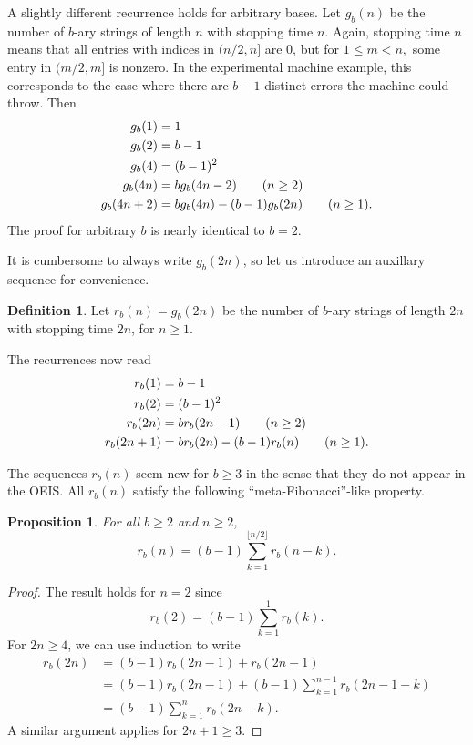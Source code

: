 \documentclass[12pt]{article}
\newtheorem{proposition}{Proposition}
\theoremstyle{definition}
\newtheorem{definition}{Definition}
\begin{document}
A slightly different recurrence holds for arbitrary bases. Let $g_b(n)$ be the
number of $b$-ary strings of length $n$ with stopping time $n$. Again, stopping
time $n$ means that all entries with indices in $(n/2, n]$ are 0, but for
$1\leq m<n,$ some entry in $(m/2, m]$ is nonzero. In the experimental machine
example, this corresponds to the case where there are $b-1$ distinct errors the
machine could throw. Then
\begin{align}
    g_b(1) &= 1 \notag \\
    g_b(2) &= b - 1 \notag \\
    g_b(4) &= (b - 1)^2 \notag \\
    g_b(4n) &= b g_b(4n - 2) \tag{$n \geq 2$}\\
    g_b(4n + 2) &= b g_b(4n) - (b - 1) g_b(2n) \tag{$n \geq 1$}.
\end{align}
The proof for arbitrary $b$ is nearly identical to $b = 2$.

It is cumbersome to always write $g_b(2n)$, so let us introduce an auxillary
sequence for convenience.

\begin{definition}
    Let $r_b(n) = g_b(2n)$ be the number of $b$-ary strings of length $2n$ with
    stopping time $2n$, for $n \geq 1$.
\end{definition}

The recurrences now read
\begin{align}
    r_b(1) &= b - 1 \notag \\
    r_b(2) &= (b - 1)^2 \notag \\
    r_b(2n) &= b r_b(2n - 1) \tag{$n \geq 2$} \\
    r_b(2n + 1) &= b r_b(2n) - (b - 1) r_b(n) \tag{$n \geq 1$}.
\end{align}

The sequences $r_b(n)$ seem new for $b \geq 3$ in the sense that they do not
appear in the OEIS. All $r_b(n)$ satisfy the following ``meta-Fibonacci''-like
property.

\begin{proposition}
    For all $b \geq 2$ and $n \geq 2$,
    \begin{equation*}
        r_b(n) = (b - 1) \sum_{k = 1}^{\lfloor n / 2 \rfloor} r_b(n - k).
    \end{equation*}
\end{proposition}

\begin{proof}
    The result holds for $n = 2$ since
    \begin{equation*}
        r_b(2) = (b - 1) \sum_{k = 1}^1 r_b(k).
    \end{equation*}
    For $2n \geq 4$, we can use induction to write
    \begin{align*}
        r_b(2n) &= (b - 1) r_b(2n - 1) + r_b(2n - 1) \\
                &= (b - 1) r_b(2n - 1) + (b - 1) \sum_{k = 1}^{n - 1} r_b(2n - 1 - k) \\
                &= (b - 1) \sum_{k = 1}^n r_b(2n - k).
    \end{align*}
    A similar argument applies for $2n + 1 \geq 3$.
\end{proof}
\end{document}
